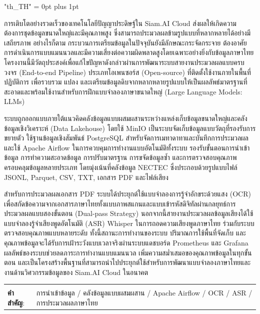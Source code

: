 \documentclass[12pt,oneside,openright,a4paper]{cpe-english-project}
\begin{document}
{
\XeTeXlinebreaklocale "th_TH"
\XeTeXlinebreakskip = 0pt plus 1pt
\thaifont
\thaiabstract

การเติบโตอย่างรวดเร็วของเทคโนโลยีปัญญาประดิษฐ์ใน Siam.AI Cloud ส่งผลให้เกิดความต้องการชุดข้อมูลขนาดใหญ่และมีคุณภาพสูง ซึ่งสามารถประมวลผลข้ามรูปแบบที่หลากหลายได้อย่างมีเสถียรภาพ อย่างไรก็ตาม กระบวนการเตรียมข้อมูลในปัจจุบันยังมีลักษณะกระจัดกระจาย ต้องอาศัยการดำเนินการแบบแมนนวลและมีความเสี่ยงต่อความผิดพลาดสูงโดยเฉพาะอย่างยิ่งกับข้อมูลภาษาไทย โครงงานนี้มีวัตถุประสงค์เพื่อแก้ไขปัญหาดังกล่าวผ่านการพัฒนาระบบสายงานประมวลผลแบบครบวงจร (End-to-end Pipeline) ประเภทโอเพนซอร์ส (Open-source) ที่ติดตั้งใช้งานภายในพื้นที่ปฏิบัติการ เพื่อรวบรวม แปลง และเตรียมข้อมูลดิบจากหลากหลายรูปแบบให้เป็นผลลัพธ์มาตรฐานที่สะอาดและพร้อมใช้งานสำหรับการฝึกแบบจำลองภาษาขนาดใหญ่ (Large Language Models: LLMs)\par

ระบบถูกออกแบบภายใต้แนวคิดคลังข้อมูลแบบผสมผสานระหว่างแหล่งเก็บข้อมูลขนาดใหญ่และคลังข้อมูลเชิงวิเคราะห์ (Data Lakehouse) โดยใช้ MinIO เป็นระบบจัดเก็บข้อมูลแบบวัตถุที่รองรับการขยายตัว ใช้ฐานข้อมูลเชิงสัมพันธ์ PostgreSQL สำหรับจัดการเมทาดาทาและบันทึกการประมวลผล และใช้ Apache Airflow ในการควบคุมการทำงานแบบอัตโนมัติทั้งระบบ รองรับขั้นตอนการนำเข้าข้อมูล การทำความสะอาดข้อมูล การปรับมาตรฐาน การขจัดข้อมูลซ้ำ และการตรวจสอบคุณภาพ ครอบคลุมข้อมูลหลายประเภท โดยมุ่งเน้นที่คลังข้อมูล NECTEC ซึ่งประกอบด้วยรูปแบบไฟล์ JSONL, Parquet, CSV, TXT, เอกสาร PDF และไฟล์เสียง\par

สำหรับการประมวลผลเอกสาร PDF ระบบได้ประยุกต์ใช้แบบจำลองการรู้จำอักขระด้วยแสง (OCR) เพื่อสกัดข้อความจากเอกสารภาษาไทยทั้งแบบภาพสแกนและแบบเข้ารหัสดิจิทัลผ่านกลยุทธ์การประมวลผลแบบสองขั้นตอน (Dual-pass Strategy) นอกจากนี้สายงานประมวลผลข้อมูลเสียงได้ใช้แบบจำลองรู้จำเสียงพูดอัตโนมัติ (ASR) Whisper ในการถอดความเสียงพูดภาษาไทย ร่วมกับระบบตรวจสอบคุณภาพแบบหลายระดับ ทั้งนี้สถานะการทำงานของระบบ ปริมาณการใช้พื้นที่จัดเก็บ และคุณภาพข้อมูลจะได้รับการเฝ้าระวังแบบเวลาจริงผ่านระบบแดชบอร์ด Prometheus และ Grafana ผลลัพธ์ของระบบช่วยลดภาระการทำงานแบบแมนนวล เพิ่มความสม่ำเสมอของคุณภาพข้อมูลในทุกขั้นตอน และเป็นโครงสร้างพื้นฐานที่สามารถนำไปประยุกต์ใช้สำหรับการพัฒนาแบบจำลองภาษาไทยและงานด้านวิศวกรรมข้อมูลของ Siam.AI Cloud ในอนาคต

\begin{flushleft}
\begin{tabular*}{\textwidth}{@{}lp{}}
 & \\
\textbf{คำสำคัญ}: & การนำเข้าข้อมูล / คลังข้อมูลแบบผสมผสาน / Apache Airflow / OCR / ASR / การประมวลผลภาษาไทย
\end{tabular*}
\end{flushleft}
\endabstract
}
\end{document}
